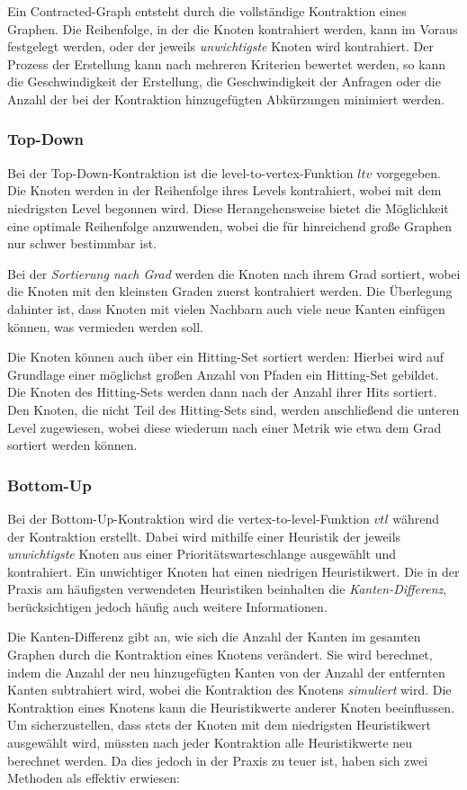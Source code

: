 Ein Contracted-Graph entsteht durch die vollständige Kontraktion eines Graphen.
Die Reihenfolge, in der die Knoten kontrahiert werden, kann im Voraus festgelegt werden, oder der jeweils \emph{unwichtigste} Knoten wird kontrahiert.
Der Prozess der Erstellung kann nach mehreren Kriterien bewertet werden, so kann die Geschwindigkeit der Erstellung, die Geschwindigkeit der Anfragen oder die Anzahl der bei der Kontraktion hinzugefügten Abkürzungen minimiert werden.

\subsubsection{Top-Down}
Bei der Top-Down-Kontraktion ist die level-to-vertex-Funktion ${ltv}$ vorgegeben.
Die Knoten werden in der Reihenfolge ihres Levels kontrahiert, wobei mit dem niedrigsten Level begonnen wird.
Diese Herangehensweise bietet die Möglichkeit eine optimale Reihenfolge anzuwenden, wobei die für hinreichend große Graphen nur schwer bestimmbar ist.

Bei der \emph{Sortierung nach Grad} werden die Knoten nach ihrem Grad sortiert, wobei die Knoten mit den kleinsten Graden zuerst kontrahiert werden.
Die Überlegung dahinter ist, dass Knoten mit vielen Nachbarn auch viele neue Kanten einfügen können, was vermieden werden soll.

Die Knoten können auch über ein Hitting-Set sortiert werden:
Hierbei wird auf Grundlage einer möglichst großen Anzahl von Pfaden ein Hitting-Set gebildet.
Die Knoten des Hitting-Sets werden dann nach der Anzahl ihrer Hits sortiert.
Den Knoten, die nicht Teil des Hitting-Sets sind, werden anschließend die unteren Level zugewiesen, wobei diese wiederum nach einer Metrik wie etwa dem Grad sortiert werden können.

\subsubsection{Bottom-Up}

Bei der Bottom-Up-Kontraktion wird die vertex-to-level-Funktion ${vtl}$ während der Kontraktion erstellt.
Dabei wird mithilfe einer Heuristik der jeweils \emph{unwichtigste} Knoten aus einer Prioritätswarteschlange ausgewählt und kontrahiert.
Ein unwichtiger Knoten hat einen niedrigen Heuristikwert.
Die in der Praxis am häufigsten verwendeten Heuristiken beinhalten die \emph{Kanten-Differenz}, berücksichtigen jedoch häufig auch weitere Informationen.

Die Kanten-Differenz gibt an, wie sich die Anzahl der Kanten im gesamten Graphen durch die Kontraktion eines Knotens verändert.
Sie wird berechnet, indem die Anzahl der neu hinzugefügten Kanten von der Anzahl der entfernten Kanten subtrahiert wird, wobei die Kontraktion des Knotens \emph{simuliert} wird.
Die Kontraktion eines Knotens kann die Heuristikwerte anderer Knoten beeinflussen.
Um sicherzustellen, dass stets der Knoten mit dem niedrigsten Heuristikwert ausgewählt wird, müssten nach jeder Kontraktion alle Heuristikwerte neu berechnet werden.
Da dies jedoch in der Praxis zu teuer ist, haben sich zwei Methoden als effektiv erwiesen:

